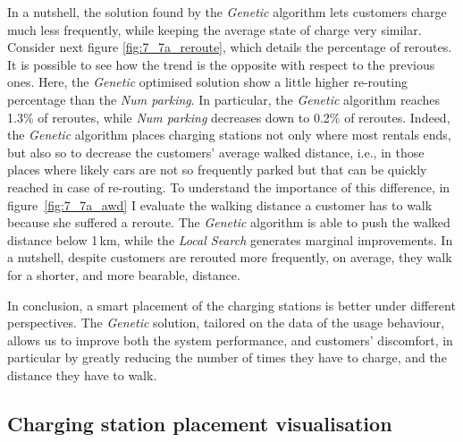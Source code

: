 In a nutshell, the solution found by the \textit{Genetic} algorithm lets customers charge much less frequently, while keeping the average state of charge very similar. Consider next figure \ref{fig:7_7a_reroute}, which details the percentage of reroutes. It is possible to see how the trend is the opposite with respect to the previous ones. Here, the \textit{Genetic} optimised solution show a little higher re-routing percentage than the \textit{Num parking}. In particular, the \textit{Genetic} algorithm reaches 1.3\% of reroutes, while \textit{Num parking} decreases down to 0.2\% of reroutes. Indeed, the \textit{Genetic} algorithm places charging stations not only where most rentals ends, but also so to decrease the customers' average walked distance, i.e., in those places where likely cars are not so frequently parked but that can be quickly reached in case of re-routing.
To understand the importance of this difference, in figure~\ref{fig:7_7a_awd} I evaluate the walking distance a customer has to walk because she suffered a reroute.  
The \textit{Genetic} algorithm is able to push the walked distance below 1\,km, while the \textit{Local Search} generates marginal improvements.
In a nutshell, despite customers are rerouted more frequently, on average, they walk for a shorter, and  more bearable, distance.


In conclusion, a smart placement of the charging stations is better under different perspectives.  The \textit{Genetic} solution, tailored on the data of the usage behaviour, allows us to improve both the system performance, and customers' discomfort, in particular by greatly reducing the number of times they have to charge, and the distance they have to walk.


\subsection{Charging station placement visualisation}

